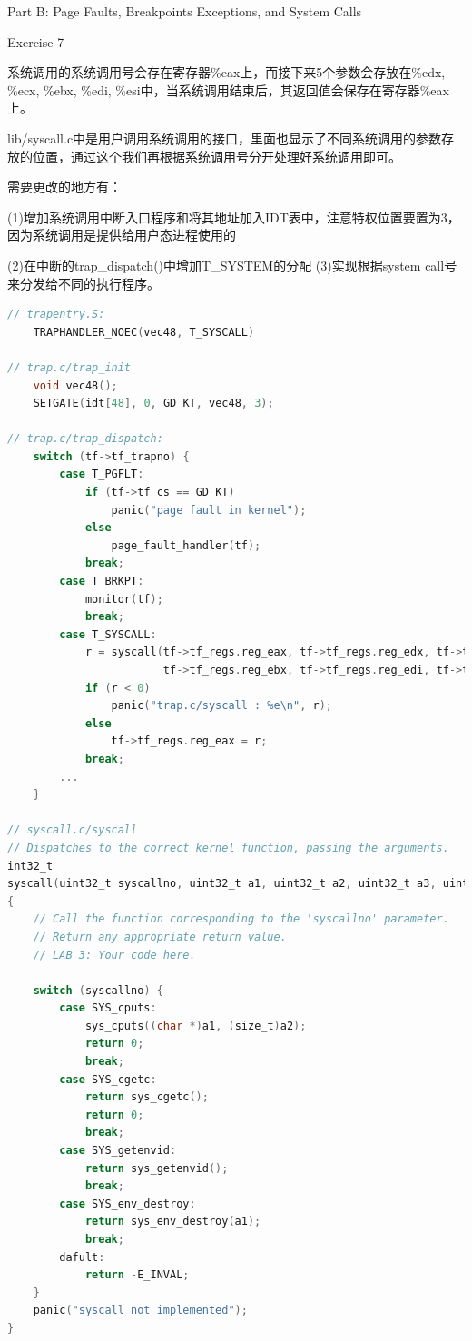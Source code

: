 \documentclass[GBK,winfonts,a4paper,10pt]{ctexart}
\begin{document}
\begin{section}{ Part B: Page Faults, Breakpoints Exceptions, and System Calls }
\begin{subsection}{ Exercise 7 }
\par
系统调用的系统调用号会存在寄存器\%eax上，而接下来5个参数会存放在\%edx, \%ecx, \%ebx, \%edi, \%esi中，当系统调用结束后，其返回值会保存在寄存器\%eax上。
\par
lib/syscall.c中是用户调用系统调用的接口，里面也显示了不同系统调用的参数存放的位置，通过这个我们再根据系统调用号分开处理好系统调用即可。
\par
需要更改的地方有：
\par
(1)增加系统调用中断入口程序和将其地址加入IDT表中，注意特权位置要置为3，因为系统调用是提供给用户态进程使用的 
\par
(2)在中断的trap\_dispatch()中增加T\_SYSTEM的分配
(3)实现根据system call号来分发给不同的执行程序。
\begin{lstlisting}[language=C]
// trapentry.S:
    TRAPHANDLER_NOEC(vec48, T_SYSCALL)

// trap.c/trap_init
    void vec48();
    SETGATE(idt[48], 0, GD_KT, vec48, 3);    
    
// trap.c/trap_dispatch:
    switch (tf->tf_trapno) {
        case T_PGFLT:
        	if (tf->tf_cs == GD_KT)
        		panic("page fault in kernel");
        	else
        		page_fault_handler(tf);
            break;
        case T_BRKPT:
            monitor(tf); 
            break;
        case T_SYSCALL:
            r = syscall(tf->tf_regs.reg_eax, tf->tf_regs.reg_edx, tf->tf_regs.reg_ecx,
                        tf->tf_regs.reg_ebx, tf->tf_regs.reg_edi, tf->tf_regs.reg_esi);
            if (r < 0)
                panic("trap.c/syscall : %e\n", r);
            else
                tf->tf_regs.reg_eax = r;
            break;
        ...
    }
    
// syscall.c/syscall
// Dispatches to the correct kernel function, passing the arguments.
int32_t
syscall(uint32_t syscallno, uint32_t a1, uint32_t a2, uint32_t a3, uint32_t a4, uint32_t a5)
{
	// Call the function corresponding to the 'syscallno' parameter.
	// Return any appropriate return value.
	// LAB 3: Your code here.
    
    switch (syscallno) {
        case SYS_cputs:
            sys_cputs((char *)a1, (size_t)a2);
            return 0;
            break;
        case SYS_cgetc:
            return sys_cgetc();
            return 0;
            break;
        case SYS_getenvid:
            return sys_getenvid();
            break;
        case SYS_env_destroy:
            return sys_env_destroy(a1);
            break;
        dafult:
            return -E_INVAL;
	}
    panic("syscall not implemented");
}
\end{lstlisting}


\end{subsection}
\end{section}
\end{document}
